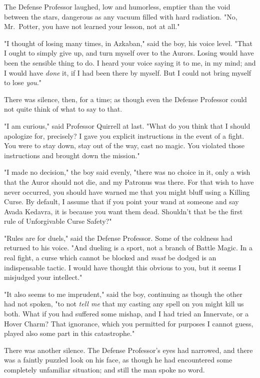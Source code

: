 The Defense Professor laughed, low and humorless, emptier than the void between
the stars, dangerous as any vacuum filled with hard radiation. "No, Mr.~Potter,
you have not learned your lesson, not at all."

"I thought of losing many times, in Azkaban," said the boy, his voice level.
"That I ought to simply give up, and turn myself over to the Aurors. Losing
would have been the sensible thing to do. I heard your voice saying it to me,
in my mind; and I would have \emph{done} it, if I had been there by myself. But
I could not bring myself to lose \emph{you}."

There was silence, then, for a time; as though even the Defense Professor could
not quite think of what to say to that.

"I am curious," said Professor Quirrell at last. "What do you think that I
should apologize for, precisely? I gave you explicit instructions in the event
of a fight. You were to stay down, stay out of the way, cast no magic. You
violated those instructions and brought down the mission."

"I made no decision," the boy said evenly, "there was no choice in it, only a
wish that the Auror should not die, and my Patronus was there. For that wish to
have never occurred, you should have warned me that you might bluff using a
Killing Curse. By default, I assume that if you point your wand at someone and
say Avada Kedavra, it is because you want them dead. Shouldn't that be the
first rule of Unforgivable Curse Safety?"

"Rules are for duels," said the Defense Professor. Some of the coldness had
returned to his voice. "And dueling is a sport, not a branch of Battle Magic.
In a real fight, a curse which cannot be blocked and \emph{must} be dodged is
an indispensable tactic. I would have thought this obvious to you, but it seems
I misjudged your intellect."

"It also seems to me imprudent," said the boy, continuing as though the other
had not spoken, "to not \emph{tell me} that my casting any spell on you might
kill us both. What if you had suffered some mishap, and I had tried an
Innervate, or a Hover Charm? That ignorance, which you permitted for purposes I
cannot guess, played also some part in this catastrophe."

There was another silence. The Defense Professor's eyes had narrowed, and there
was a faintly puzzled look on his face, as though he had encountered some
completely unfamiliar situation; and still the man spoke no word.

